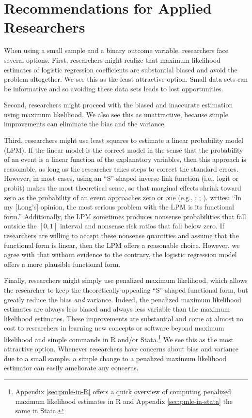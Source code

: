 \documentclass[12pt]{article}
\begin{document}
\section*{Recommendations for Applied Researchers}

When using a small sample and a binary outcome variable, researchers face several options. First, researchers might realize that maximum likelihood estimates of logistic regression coefficients are substantial biased and avoid the problem altogether. 
We see this as the least attractive option. 
Small data sets can be informative and so avoiding these data sets leads to lost opportunities.

Second, researchers might proceed with the biased and inaccurate estimation using maximum likelihood. 
We also see this as unattractive, because simple improvements can eliminate the bias and the variance.

Third, researchers might use least squares to estimate a linear probability model (LPM). If the linear model is the correct model in the sense that the probability of an event is a linear function of the explanatory variables, then this approach is reasonable, as long as the researcher takes steps to correct the standard errors. 
However, in most cases, using an ``S''-shaped inverse-link function (i.e., logit or probit) makes the most theoretical sense, so that marginal effects shrink toward zero as the probability of an event approaches zero or one (e.g., \citealt{Rainey2015}; \citealt{BerryDeMerittEsarey2010}; \citealt[pp. 34-47]{Long1997}). 
\citet[p. 40]{Long1997} writes: ``In my [Long's] opinion, the most serious problem with the LPM is its functional form.'' 
Additionally, the LPM sometimes produces nonsense probabilities that fall outside the $[0, 1]$ interval and nonsense risk ratios that fall below zero.
If researchers are willing to accept these nonsense quantities and assume that the functional form is linear, then the LPM offers a reasonable choice. 
However, we agree with \cite{Long1997} that without evidence to the contrary, the logistic regression model offers a more plausible functional form.

Finally, researchers might simply use penalized maximum likelihood, which allows the researcher to keep the theoretically-appealing ``S''-shaped functional form, but greatly reduce the bias \textit{and} variance. 
Indeed, the penalized maximum likelihood estimates are always less biased and always less variable than the maximum likelihood estimates.
These improvements are substantial and come at almost no cost to researchers in learning new concepts or software beyond maximum likelihood and simple commands in R and/or Stata.\footnote{Appendix \ref{sec:pmle-in-R} offers a quick overview of computing penalized maximum likelihood estimates in R and Appendix \ref{sec:pmle-in-stata} the same in Stata.} 
We see this as the most attractive option. 
Whenever researchers have concerns about bias and variance due to a small sample, a simple change to a penalized maximum likelihood estimator can easily ameliorate any concerns. 
\end{document}
